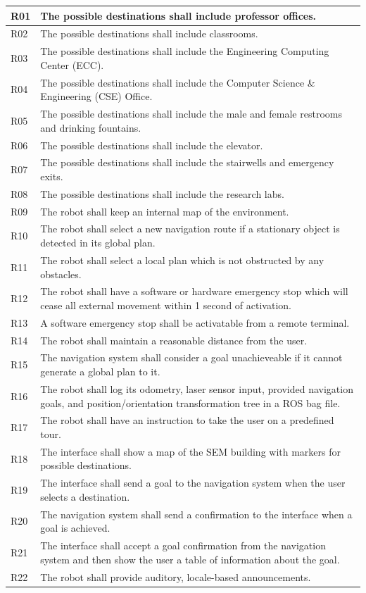 \documentclass[11pt]{report}
\begin{document}
\begin{longtable}{|p{0.9cm}|p{11.55cm}|}
R01&The possible destinations shall include professor offices. \\ \hline
R02&The possible destinations shall include classrooms.\\ \hline
R03&The possible destinations shall include the Engineering Computing Center (ECC).\\ \hline
R04&The possible destinations shall include the Computer Science \& Engineering (CSE) Office.\\ \hline
R05&The possible destinations shall include the male and female restrooms and drinking fountains.\\ \hline
R06&The possible destinations shall include the elevator.\\ \hline
R07&The possible destinations shall include the stairwells and emergency exits.\\ \hline
R08&The possible destinations shall include the research labs.\\ \hline
R09&The robot shall keep an internal map of the environment.\\ \hline
R10&The robot shall select a new navigation route if a stationary object is detected in its global plan.\\ \hline
R11&The robot shall select a local plan which is not obstructed by any obstacles.\\ \hline
R12&The robot shall have a software or hardware emergency stop which will cease all external movement within 1 second of activation.\\ \hline
R13&A software emergency stop shall be activatable from a remote terminal.\\ \hline
R14&The robot shall maintain a reasonable distance from the user.\\ \hline
R15&The navigation system shall consider a goal unachieveable if it cannot generate a global plan to it.\\ \hline
R16&The robot shall log its odometry, laser sensor input, provided navigation goals, and position/orientation transformation tree in a ROS bag file.\\ \hline
R17&The robot shall have an instruction to take the user on a predefined tour.\\ \hline
R18&The interface shall show a map of the SEM building with markers for possible destinations.\\ \hline
R19&The interface shall send a goal to the navigation system when the user selects a destination.\\ \hline
R20&The navigation system shall send a confirmation to the interface when a goal is achieved. \\ \hline
R21&The interface shall accept a goal confirmation from the navigation system and then show the user a table of information about the goal.\\ \hline
R22&The robot shall provide auditory, locale-based announcements.\\ \hline
\end{longtable}
\end{document}
